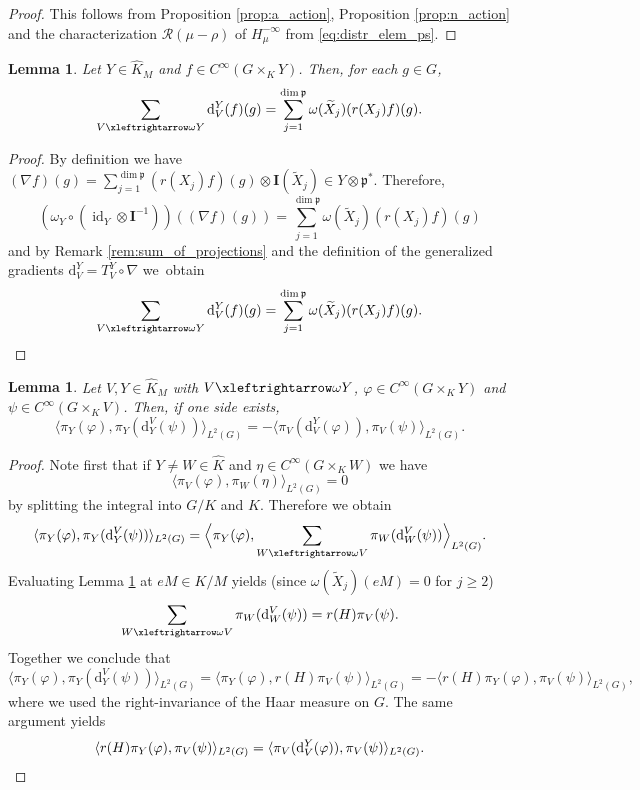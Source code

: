 \documentclass[JEP,XML,SOM,NoFloatCountersInSection,Unicode,published]{cedram}
\newtheorem{lemma}[theorem]{Lemma}
\theoremstyle{definition}
\newcommand{\lraomega}{\ensuremath{\xleftrightarrow\omega}}
\newcommand{\mc}[1]{\ensuremath{\mathcal{#1}}}
\newcommand{\mf}[1]{\ensuremath{\mathfrak{#1}}}
\newcommand{\on}[1]{\ensuremath{\operatorname{#1}}}
\newcommand{\rhoa}{\ensuremath{\rho}}
\newcommand{\pstd}[1]{\ensuremath{H_{#1}^{-\infty}}}
\newcommand{\I}{\ensuremath{\mathbf{I}}}
\begin{document}
\begin{proof}
This follows from Proposition \ref{prop:a_action}, Proposition \ref{prop:n_action} and the characterization $\mc R(\mu-\rhoa)$ of $\pstd{\mu}$ from \eqref{eq:distr_elem_ps}.
\end{proof}

\begin{lemma}\label{la:sum_gen_grad}
Let $Y\in\hat K_M$ and $f\in C^\infty(G\times_KY)$. Then, for each $g\in G$,
\[
\sum_{V\lraomega Y}\mathrm{d}_V^Y(f)(g)=\sum_{j=1}^{\dim\mf p}\omega(\widetilde X_j)(r(X_j)f)(g).
\]
\end{lemma}

\begin{proof}
By definition we have $(\nabla f)(g)=\sum_{j=1}^{\dim\mf p}(r(X_j)f)(g)\otimes\I(\widetilde X_j)\in Y\otimes\mf p^*$.
Therefore,
\[
(\omega_Y\circ(\on{id}_Y\otimes\I^{-1}))((\nabla f)(g))=\sum_{j=1}^{\dim\mf p}\omega(\widetilde X_j)(r(X_j)f)(g)
\]
and by Remark \ref{rem:sum_of_projections} and the definition of the generalized gradients $\mathrm{d}_V^Y=T_V^Y\circ\nabla$ we~obtain
\[
\sum_{V\lraomega Y}\mathrm{d}_V^Y(f)(g)=\sum_{j=1}^{\dim\mf p}\omega(\widetilde X_j)(r(X_j)f)(g).\qedhere
\]
\end{proof}

\begin{lemma}\label{la:gen_grad_adjoint}
Let $V, Y\!\in\!\hat K_M$ with $V\lraomega Y$, $\varphi\!\in\! C^\infty(G\times_KY)$ and $\psi\!\in\! C^\infty(G\times_KV)$. Then, if one side exists,
\[
\langle\pi_Y(\varphi),\pi_Y(\mathrm{d}_Y^V(\psi))\rangle_{L^2(G)}=-\langle\pi_V(\mathrm{d}_V^Y(\varphi)),\pi_V(\psi)\rangle_{L^2(G)}.
\]
\end{lemma}

\begin{proof}
Note first that if $Y\neq W\in\hat K$ and $\eta\in C^\infty(G\times_KW)$ we have
\[
\langle\pi_V(\varphi),\pi_W(\eta)\rangle_{L^2(G)}=0
\]
by splitting the integral into $G/K$ and $K$. Therefore we obtain
\[
\langle\pi_Y(\varphi),\pi_Y(\mathrm{d}_Y^V(\psi))\rangle_{L^2(G)}=\Bigl\langle\pi_Y(\varphi),\sum_{W\lraomega V}\pi_W(\mathrm{d}_W^V(\psi))\Bigr\rangle_{L^2(G)}.
\]
Evaluating Lemma \ref{la:sum_gen_grad} at $eM\in K/M$ yields (since $\omega(\widetilde X_j)(eM)=0$ for $j\geq 2$)
\[
\sum_{W\lraomega V}\pi_W(\mathrm{d}_W^V(\psi))=r(H)\pi_V(\psi).
\]
Together we conclude that
\[
\langle\pi_Y(\varphi),\pi_Y(\mathrm{d}_Y^V(\psi))\rangle_{L^2(G)}=\langle\pi_Y(\varphi),r(H)\pi_V(\psi)\rangle_{L^2(G)}=-\langle r(H)\pi_Y(\varphi),\pi_V(\psi)\rangle_{L^2(G)},
\]
where we used the right-invariance of the Haar measure on $G$. The same argument yields
\[
\langle r(H)\pi_Y(\varphi),\pi_V(\psi)\rangle_{L^2(G)}=\langle\pi_V(\mathrm{d}_V^Y(\varphi)),\pi_V(\psi)\rangle_{L^2(G)}.\qedhere
\]
\end{proof}
\end{document}
